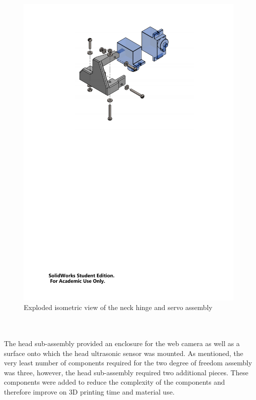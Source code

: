         \begin{figure}[h!]
          \centering
          \includegraphics[clip, trim=3cm 17cm 3cm 1cm, width=1\linewidth]{figures/neck-hinge-servo-sub-expl}
          \caption[Exploded isometric view of the neck hinge and servo assembly]{Exploded isometric view of the neck hinge and servo assembly}
          \label{fig:mechDesign-neckHingeServoSubExpl}
        \end{figure}

      \\\\
        The head sub-assembly provided an enclosure for the web camera as well as a surface onto which the head ultrasonic sensor was mounted. As mentioned, the very least number of components required for the two degree of freedom assembly was three, however, the head sub-assembly required two additional pieces. These components were added to reduce the complexity of the components and therefore improve on 3D printing time and material use.
        
